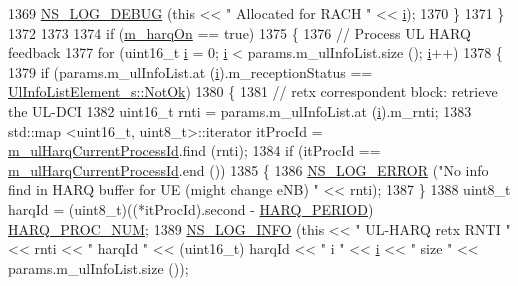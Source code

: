 \begin{DoxyCode}
1369           \hyperlink{group__logging_ga413f1886406d49f59a6a0a89b77b4d0a}{NS\_LOG\_DEBUG} (\textcolor{keyword}{this} << \textcolor{stringliteral}{" Allocated for RACH "} << \hyperlink{bernuolliDistribution_8m_a6f6ccfcf58b31cb6412107d9d5281426}{i});
1370         \}
1371     \}
1372 
1373 
1374   \textcolor{keywordflow}{if} (\hyperlink{classns3_1_1TdBetFfMacScheduler_a8de90c082c621bf8d664fff8cf370acb}{m\_harqOn} == \textcolor{keyword}{true})
1375     \{
1376       \textcolor{comment}{//   Process UL HARQ feedback}
1377       \textcolor{keywordflow}{for} (uint16\_t \hyperlink{bernuolliDistribution_8m_a6f6ccfcf58b31cb6412107d9d5281426}{i} = 0; \hyperlink{bernuolliDistribution_8m_a6f6ccfcf58b31cb6412107d9d5281426}{i} < params.m\_ulInfoList.size (); \hyperlink{bernuolliDistribution_8m_a6f6ccfcf58b31cb6412107d9d5281426}{i}++)
1378         \{        
1379           \textcolor{keywordflow}{if} (params.m\_ulInfoList.at (\hyperlink{bernuolliDistribution_8m_a6f6ccfcf58b31cb6412107d9d5281426}{i}).m\_receptionStatus == 
      \hyperlink{structns3_1_1UlInfoListElement__s_a2a4dff5145d25c81086660e991db6f61a98aed738fd24811d3461668e394a53c8}{UlInfoListElement\_s::NotOk})
1380             \{
1381               \textcolor{comment}{// retx correspondent block: retrieve the UL-DCI}
1382               uint16\_t rnti = params.m\_ulInfoList.at (\hyperlink{bernuolliDistribution_8m_a6f6ccfcf58b31cb6412107d9d5281426}{i}).m\_rnti;
1383               std::map <uint16\_t, uint8\_t>::iterator itProcId = 
      \hyperlink{classns3_1_1TdBetFfMacScheduler_a0776a2fc3f7186d7ec4491dc21706596}{m\_ulHarqCurrentProcessId}.find (rnti);
1384               \textcolor{keywordflow}{if} (itProcId == \hyperlink{classns3_1_1TdBetFfMacScheduler_a0776a2fc3f7186d7ec4491dc21706596}{m\_ulHarqCurrentProcessId}.end ())
1385                 \{
1386                   \hyperlink{group__logging_ga0261a8db1d4ac5f79417d117634fd455}{NS\_LOG\_ERROR} (\textcolor{stringliteral}{"No info find in HARQ buffer for UE (might change eNB) "} << 
      rnti);
1387                 \}
1388               uint8\_t harqId = (uint8\_t)((*itProcId).second - \hyperlink{lte-common_8h_a275321ee206f130c3ddc81fcdaa13cfd}{HARQ\_PERIOD}) %
      \hyperlink{cqa-ff-mac-scheduler_8h_a9185d8d7d2b2979181d4a7044a3d3555}{HARQ\_PROC\_NUM};
1389               \hyperlink{group__logging_gafbd73ee2cf9f26b319f49086d8e860fb}{NS\_LOG\_INFO} (\textcolor{keyword}{this} << \textcolor{stringliteral}{" UL-HARQ retx RNTI "} << rnti << \textcolor{stringliteral}{" harqId "} << (uint16\_t)
      harqId << \textcolor{stringliteral}{" i "} << \hyperlink{bernuolliDistribution_8m_a6f6ccfcf58b31cb6412107d9d5281426}{i} << \textcolor{stringliteral}{" size "}  << params.m\_ulInfoList.size ());

\end{DoxyCode}
